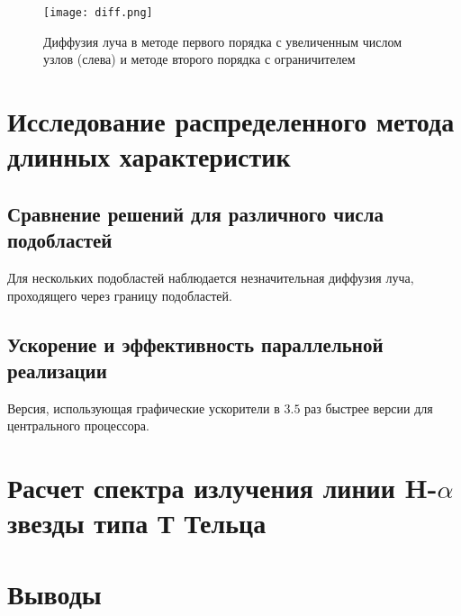 \begin{figure}[ht!]
\centering
\texttt{[image: diff.png]}
\caption{Диффузия луча в методе первого порядка с увеличенным числом узлов (слева) и методе второго порядка с ограничителем}
\label{fig:diff}
\end{figure}

\section{Исследование распределенного метода длинных характеристик}

\subsection{Сравнение решений для различного числа подобластей}

Для нескольких подобластей наблюдается незначительная диффузия луча, проходящего через границу подобластей.

\subsection{Ускорение и эффективность параллельной реализации}

Версия, использующая графические ускорители в $3.5$ раз быстрее версии для центрального процессора.

\section{Расчет спектра излучения линии H-$\alpha$ звезды типа Т Тельца}

\section{Выводы}
